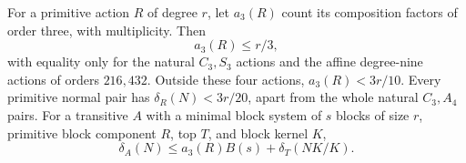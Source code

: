 \begin{lemma}\label{lem:ternary-block}
For a primitive action $R$ of degree $r$, let $a_3(R)$ count its
composition factors of order three, with multiplicity. Then
\[
 a_3(R)\leq r/3,
\]
with equality only for the natural $C_3,S_3$ actions and the affine
degree-nine actions of orders $216,432$. Outside these four actions,
$a_3(R)<3r/10$. Every primitive normal pair has
$\delta_R(N)<3r/20$, apart from the whole natural $C_3,A_4$ pairs.
For a transitive $A$ with a minimal block system of $s$ blocks of size
$r$, primitive block component $R$, top $T$, and block kernel $K$,
\begin{equation}\label{eq:ternary-block-recurrence}
 \delta_A(N)\leq a_3(R)B(s)+\delta_T(NK/K).
\end{equation}
\end{lemma}
